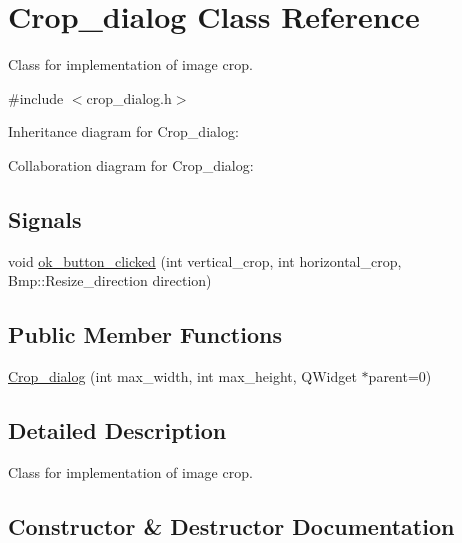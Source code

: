 \hypertarget{classCrop__dialog}{}\section{Crop\+\_\+dialog Class Reference}
\label{classCrop__dialog}


Class for implementation of image crop.  




{\ttfamily \#include $<$crop\+\_\+dialog.\+h$>$}



Inheritance diagram for Crop\+\_\+dialog\+:


Collaboration diagram for Crop\+\_\+dialog\+:
\subsection*{Signals}
\begin{DoxyCompactItemize}
\item 
void \hyperlink{classCrop__dialog_a89cb1bf27ead80a5419d59a27e287576}{ok\+\_\+button\+\_\+clicked} (int vertical\+\_\+crop, int horizontal\+\_\+crop, Bmp\+::\+Resize\+\_\+direction direction)
\end{DoxyCompactItemize}
\subsection*{Public Member Functions}
\begin{DoxyCompactItemize}
\item 
\hyperlink{classCrop__dialog_ae3f26b66c76ab3881694bb6ead0b1d8f}{Crop\+\_\+dialog} (int max\+\_\+width, int max\+\_\+height, Q\+Widget $\ast$parent=0)
\end{DoxyCompactItemize}


\subsection{Detailed Description}
Class for implementation of image crop. 

\subsection{Constructor \& Destructor Documentation}
